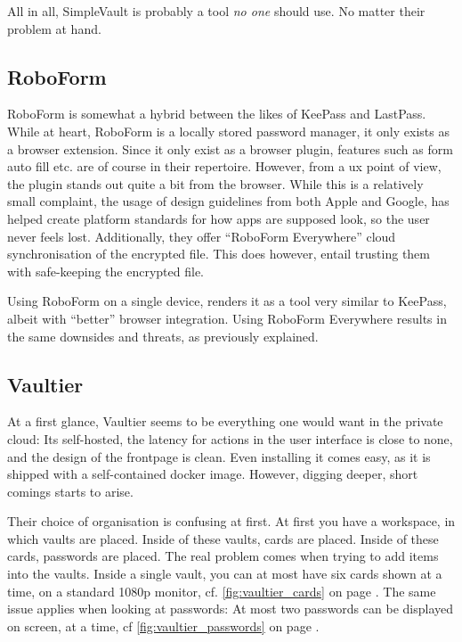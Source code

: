 			All in all, SimpleVault is probably a tool \emph{no one} should use. No matter their problem at hand.

		\subsection*{RoboForm}
			RoboForm\cite{roboform} is somewhat a hybrid between the likes of KeePass and LastPass. While at heart, RoboForm is a locally stored password manager, it only exists as a browser extension. Since it only exist as a browser plugin, features such as form auto fill etc. are of course in their repertoire. However, from a ux point of view, the plugin stands out quite a bit from the browser. While this is a relatively small complaint, the usage of design guidelines from both Apple and Google, has helped create platform standards for how apps are supposed look, so the user never feels lost. Additionally, they offer ``RoboForm Everywhere'' cloud synchronisation of the encrypted file. This does however, entail trusting them with safe-keeping the encrypted file.

			Using RoboForm on a single device, renders it as a tool very similar to KeePass, albeit with ``better'' browser integration. Using RoboForm Everywhere results in the same downsides and threats, as previously explained.

		\subsection*{Vaultier}
			At a first glance, Vaultier\cite{vaultier} seems to be everything one would want in the private cloud: Its self-hosted, the latency for actions in the user interface is close to none, and the design of the frontpage is clean. Even installing it comes easy, as it is shipped with a self-contained docker image. However, digging deeper, short comings starts to arise.

			Their choice of organisation is confusing at first. At first you have a workspace, in which vaults are placed. Inside of these vaults, cards are placed. Inside of these cards, passwords are placed. The real problem comes when trying to add items into the vaults. Inside a single vault, you can at most have six cards shown at a time, on a standard 1080p monitor, cf. \ref{fig:vaultier_cards} on page \pageref{fig:vaultier_cards}. The same issue applies when looking at passwords: At most two passwords can be displayed on screen, at a time, cf \ref{fig:vaultier_passwords} on page \pageref{fig:vaultier_passwords}.

